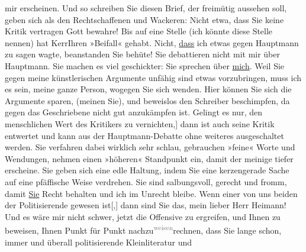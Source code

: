 \begin{ledgroupsized}[t]{13cm}
               mir erscheinen.\pend
           \pstart
           Und so schreiben Sie diesen Brief, der freimütig aussehen soll, geben sich als den
               Rechtschaffenen und Wackeren: Nicht etwa, dass Sie keine Kritik vertragen {\dotstwo} Gott bewahre! Bis auf eine Stelle (ich könnte diese
               Stelle nennen) hat KerrIhren »Beifall« gehabt. Nicht,
                  \uline{dass} ich etwas gegen Hauptmann zu sagen wagte, beanstanden Sie {\dotstwo} behüte! Sie debattieren nicht mit mir über Hauptmann. Sie machen es viel geschickter: Sie
               sprechen über \uline{mich}. Weil Sie gegen meine
               künstlerischen Argumente unfähig sind etwas vorzubringen, muss ich es sein, meine
               ganze Person, wogegen Sie sich wenden. Hier können Sie sich die Argumente sparen,
               (meinen Sie), und beweislos den Schreiber beschimpfen, da gegen das Geschriebene
               nicht gut anzukämpfen ist. Gelingt es nur, den menschlichen Wert des Kritikers zu
                  vernichten\strikeout{n}{[},{]} dann ist auch seine Kritik entwertet und kann aus der Hauptmann-Debatte ohne weiteres ausgeschaltet
               werden.\pend
           \pstart
           Sie verfahren dabei wirklich sehr schlau, gebrauchen »feine« Worte und Wendungen,
               nehmen einen »höheren« Standpunkt ein, damit der meinige tiefer erscheine. Sie geben
               sich eine edle Haltung, indem Sie eine kerzengerade Sache auf eine pfäffische Weise
               verdrehen. Sie sind salbungsvoll, gerecht und fromm, damit \uline{Sie} Recht behalten und ich im Unrecht bleibe.\pend
           \pstart
           Wenn einer von uns beiden der Politisierende gewesen ist{[},{]} dann
               sind Sie das, mein lieber Herr Heimann! Und es
               wäre mir nicht schwer, jetzt die Offensive zu ergreifen, und Ihnen zu beweisen, Ihnen
               Punkt für Punkt nachzu\substVorne{}\textsuperscript{\textcolor{gray}{weisen}}{\allowbreak}\substDazwischen{}rechnen\substHinten{}, dass Sie lange schon, immer und überall politisierende Kleinliteratur und

\end{ledgroupsized}
